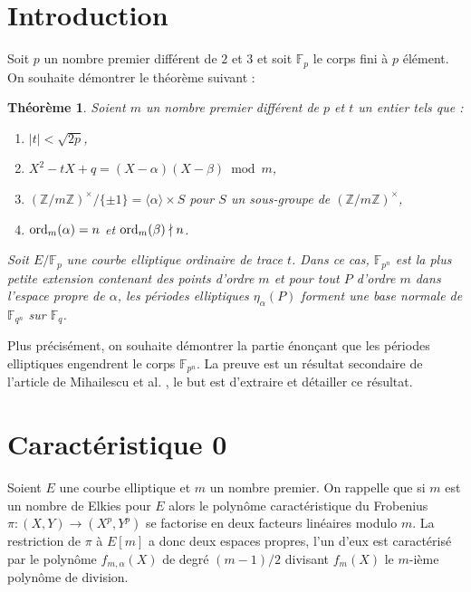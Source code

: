 \documentclass[a4paper]{article} %
\newcommand\zmodninv[1]{(\mathbb{Z}/#1\mathbb{Z})^{\times}}
\newcommand\GF[1]{\mathbb{F}_{#1}}
\newcommand\groupgen[1]{\langle{#1}\rangle}
\newcommand\ord[2]{\textup{ord}_{#1}(#2)}
\begin{document}
\newtheorem{thm}{Théorème}[section]
\newtheorem{lem}[thm]{Lemme}
\newtheorem{fac}[thm]{Fait}
\newtheorem{cor}[thm]{Corollaire}
\newtheorem{prop}[thm]{Proposition}
\newtheorem{conj}[thm]{Conjecture}
\newtheorem*{thmn}{Théorème}
\theoremstyle{definition}
\newtheorem{defn}[thm]{Définition}
\newtheorem{defnp}[thm]{Définition et proposition}
\newtheorem*{ex}{Exemple}
\theoremstyle{remark}
\newtheorem*{rem}{Remarque}
\section{Introduction}
Soit $p$ un nombre premier différent de $2$ et $3$ et soit $\GF{p}$ le corps
fini à $p$ élément. On souhaite démontrer le théorème suivant :

\begin{thmn}
\label{conj:gaussellnorm}
Soient $m$ un nombre premier différent de $p$ et $t$ un entier tels que :
\begin{enumerate}[1.]
    \item $|t| < \sqrt{2p}$,
    \item $X^2 - tX + q = (X - \alpha)(X - \beta)\bmod{m}$,
    \item $\zmodninv{m}/\lbrace{\pm1}\rbrace = \groupgen{\alpha}\times S$ pour
    $S$ un sous-groupe de $\zmodninv{m}$,
    \item $\ord{m}{\alpha} = n$ et $\ord{m}{\beta}\nmid n$.
\end{enumerate}
Soit $E/\GF{p}$ une courbe elliptique ordinaire de trace $t$. Dans ce cas, 
$\GF{p^n}$ est la plus petite extension contenant des points d'ordre $m$ et 
pour tout $P$ d'ordre $m$ dans l'espace propre de $\alpha$, les périodes 
elliptiques $\eta_{\alpha}(P)$ forment une base normale de $\GF{q^n}$ sur 
$\GF{q}$.\par
\end{thmn}

Plus précisément, on souhaite démontrer la partie énonçant que les périodes
elliptiques engendrent le corps $\GF{p^n}$. La preuve est un résultat secondaire
de l'article de Mihailescu et al. \cite{MiMoSch}, le but est d'extraire et
détailler ce résultat.

\section{Caractéristique 0}

Soient $E$ une courbe elliptique et $m$ un nombre premier. On rappelle que si 
$m$ est un nombre de Elkies pour $E$ alors le polynôme caractéristique du 
Frobenius $\pi : (X,Y) \to (X^p, Y^p)$ se factorise en deux facteurs linéaires
modulo $m$. La restriction de $\pi$ à $E[m]$ a donc deux espaces propres, l'un
d'eux est caractérisé par le polynôme $f_{m,\alpha}(X)$ de degré $(m-1)/2$
divisant $f_m(X)$ le $m$-ième polynôme de division.\par
\end{document}

